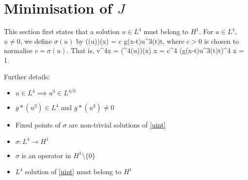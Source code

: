 \section{Minimisation of $J$}
This section first states that a solution $u\in L^4$ must belong to $H^1$.
For $u\in L^4$, $u\neq 0$, we define $\sigma(u)$ by 
\be \label{sigmadef} \left(\sigma(u)\right)(x) = c \int g(x-t)u^3(t)\diff t, \ee
where $c>0$ is chosen to normalise $v=\sigma(u)$. That is,
\be\label{vnorm} \int v^4\diff x = 
\int \left(\sigma^4(u)\right)(x) \diff x =
c^4 \int \left(\int g(x-t)u^3(t)\diff t\right)^4 \diff x = 1. \ee

{\red Further details:}
\begin{itemize}
    \item $u\in L^4\implies u^3\in L^{4/3}$
    \item $g\ast (u^3)\in L^4$ and $g\ast (u^3)\neq 0$
    \item Fixed points of $\sigma$ are non-trivial solutions of \eqref{uint}
    \item $\sigma: L^4\to H^1$
    \item $\sigma$ is an operator in $H^1\setminus\{0\}$
    \item $L^4$ solution of \eqref{uint} must belong to $H^1$
\end{itemize}

